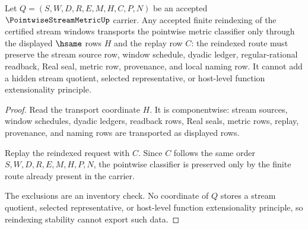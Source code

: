 \begin{theorem}
\label{thm:pointwise-stream-metric-reindexing-stability}
Let $Q=(S,W,D,R,E,M,H,C,P,N)$ be an accepted $\PointwiseStreamMetricUp$ carrier. Any accepted finite reindexing of the certified stream windows transports the pointwise metric classifier only through the displayed $\hsame$ rows $H$ and the replay row $C$: the reindexed route must preserve the stream source row, window schedule, dyadic ledger, regular-rational readback, Real seal, metric row, provenance, and local naming row. It cannot add a hidden stream quotient, selected representative, or host-level function extensionality principle.
\end{theorem}
\begin{proof}
Read the transport coordinate $H$. It is componentwise: stream sources, window schedules, dyadic ledgers, readback rows, Real seals, metric rows, replay, provenance, and naming rows are transported as displayed rows.

Replay the reindexed request with $C$. Since $C$ follows the same order $S,W,D,R,E,M,H,P,N$, the pointwise classifier is preserved only by the finite route already present in the carrier.

The exclusions are an inventory check. No coordinate of $Q$ stores a stream quotient, selected representative, or host-level function extensionality principle, so reindexing stability cannot export such data.
\end{proof}

